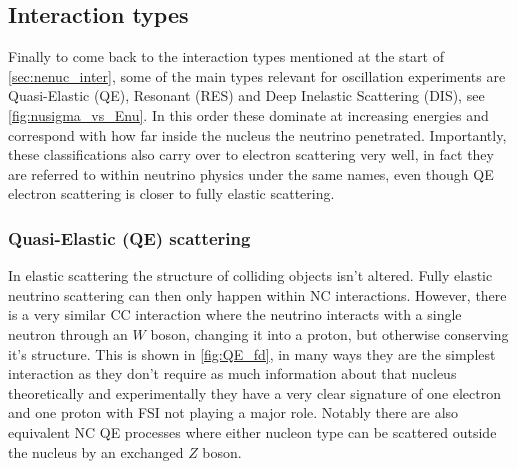 \documentclass[a4paper,12pt]{article}
\begin{document}
\subsection{Interaction types}\label{sec:inttyp}
Finally to come back to the interaction types mentioned at the start of \cref{sec:nenuc_inter}, some of the main types relevant for oscillation experiments are Quasi-Elastic (QE), Resonant (RES) and Deep Inelastic Scattering (DIS), see \cref{fig:nusigma_vs_Enu}.
In this order these dominate at increasing energies and correspond with how far inside the nucleus the neutrino penetrated.
Importantly, these classifications also carry over to electron scattering very well, in fact they are referred to within neutrino physics under the same names, even though QE electron scattering is closer to fully elastic scattering.

\subsubsection{Quasi-Elastic (QE) scattering}
In elastic scattering the structure of colliding objects isn't altered.
Fully elastic neutrino scattering can then only happen within NC interactions.
However, there is a very similar CC interaction where the neutrino interacts with a single neutron through an $W$ boson, changing it into a proton, but otherwise conserving it's structure.
This is shown in \cref{fig:QE_fd}, in many ways they are the simplest interaction as they don't require as much information about that nucleus theoretically and experimentally they have a very clear signature of one electron and one proton with FSI not playing a major role.
Notably there are also equivalent NC QE processes where either nucleon type can be scattered outside the nucleus by an exchanged $Z$ boson.
\end{document}
